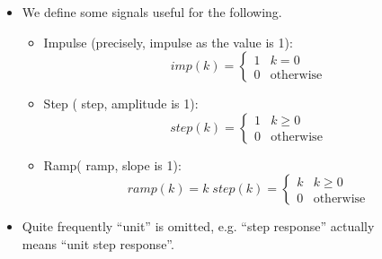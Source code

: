 \begin{frame}
\framesubtitleTC{}
\myPause
 \begin{itemize}[<+-| alert@+>]
 \item We define some signals useful for the following.
       \begin{itemize}[<+-| alert@+>]
       \item Impulse (precisely,  impulse as the value is 1):
             \begin{displaymath}
              imp(k) = \begin{cases} 1 & k=0 \\ 0 & \text{otherwise} \end{cases}
             \end{displaymath}
       \item Step ( step, amplitude is 1):
             \begin{displaymath}
              step(k) = \begin{cases} 1 & k \geq 0 \\ 0 & \text{otherwise} \end{cases}
             \end{displaymath}
       \item Ramp( ramp, slope is 1):
             \begin{displaymath}
              ramp(k) = k\; step(k) = \begin{cases} k & k \geq 0 \\ 0 & \text{otherwise} \end{cases}
             \end{displaymath}
       \end{itemize}
 \item Quite frequently ``unit'' is omitted, e.g. ``step response'' actually\\
       means ``unit step response''.
 \end{itemize}
\end{frame}


